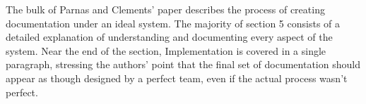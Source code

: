 \documentclass[11pt]{article}
\begin{document}
The bulk of Parnas and Clements' paper describes the process of creating documentation under an ideal system.  The majority of section 5 consists of a detailed explanation of understanding and documenting every aspect of the system.  Near the end of the section, Implementation is covered in a single paragraph, stressing the authors' point that the final set of documentation should appear as though designed by a perfect team, even if the actual process wasn't perfect.

\newpage

\nocite{*}




\end{document}
